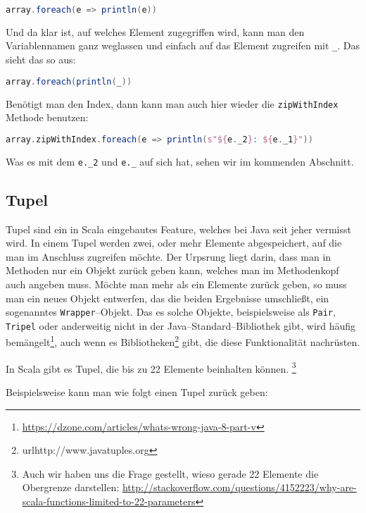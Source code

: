 \begin{lstlisting}[language=Scala,numbers=none]
array.foreach(e => println(e))
\end{lstlisting}

Und da klar ist, auf welches Element zugegriffen wird, kann man den Variablennamen ganz weglassen und einfach auf das Element zugreifen mit \texttt{\_}. Das sieht das so aus:

\begin{lstlisting}[language=Scala,numbers=none]
array.foreach(println(_))
\end{lstlisting}

Benötigt man den Index, dann kann man auch hier wieder die \texttt{zipWithIndex} Methode benutzen:

\begin{lstlisting}[language=Scala,numbers=none]
array.zipWithIndex.foreach(e => println(s"${e._2}: ${e._1}"))
\end{lstlisting}

Was es mit dem \texttt{e.\_2} und \texttt{e.\_} auf sich hat, sehen wir im kommenden Abschnitt.

\subsection{Tupel}
Tupel sind ein in Scala eingebautes Feature, welches bei Java seit jeher vermisst wird. In einem Tupel werden zwei, oder mehr Elemente abgespeichert, auf die man im Anschluss zugreifen möchte. Der Urpsrung liegt darin, dass man in Methoden nur ein Objekt zurück geben kann, welches man im Methodenkopf auch angeben muss. Möchte man mehr als ein Elemente zurück geben, so muss man ein neues Objekt entwerfen, das die beiden Ergebnisse umschließt, ein sogenanntes \texttt{Wrapper}--Objekt. Das es solche Objekte, beispielsweise als \texttt{Pair}, \texttt{Tripel} oder anderweitig nicht in der Java--Standard--Bibliothek gibt, wird häufig bemängelt\footnote{\url{https://dzone.com/articles/whats-wrong-java-8-part-v}}, auch wenn es Bibliotheken\footnote{url{http://www.javatuples.org}} gibt, die diese Funktionalität nachrüsten.

In Scala gibt es Tupel, die bis zu 22 Elemente beinhalten können. \footnote{Auch wir haben uns die Frage gestellt, wieso gerade 22 Elemente die Obergrenze darstellen: \url{http://stackoverflow.com/questions/4152223/why-are-scala-functions-limited-to-22-parameters}}

Beispielsweise kann man wie folgt einen Tupel zurück geben:

